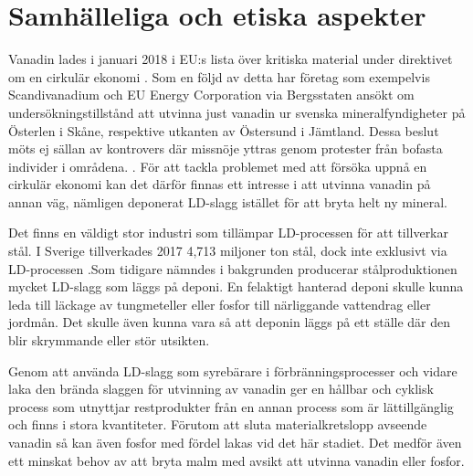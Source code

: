 \section{Samhälleliga och etiska aspekter}

Vanadin lades i januari 2018 i EU:s lista över kritiska material under direktivet om en cirkulär ekonomi \cite{Navigation2018}. 
Som en följd av detta har företag som exempelvis Scandivanadium och EU Energy Corporation via Bergsstaten ansökt om undersökningstillstånd att utvinna just vanadin ur svenska mineralfyndigheter på Österlen i Skåne, respektive utkanten av Östersund i Jämtland. Dessa beslut möts ej sällan av kontrovers där missnöje yttras genom protester från bofasta individer i områdena. \cite{NohrstedtLinda2018}. 
För att tackla problemet med att försöka uppnå en cirkulär ekonomi kan det därför finnas ett intresse i att utvinna vanadin på annan väg, nämligen deponerat LD-slagg istället för att bryta helt ny mineral.

Det finns en  väldigt stor industri som tillämpar LD-processen för att tillverkar stål. I Sverige tillverkades 2017 4,713 miljoner ton stål, dock inte exklusivt via LD-processen \cite{WorldSteelAssociation2015}.Som tidigare nämndes i bakgrunden producerar stålproduktionen mycket LD-slagg som läggs på deponi. En felaktigt hanterad deponi skulle kunna leda till läckage av tungmeteller eller fosfor till närliggande vattendrag eller jordmån. Det skulle även kunna vara så att deponin läggs på ett ställe där den blir skrymmande eller stör utsikten. 

Genom att använda LD-slagg som syrebärare i förbränningsprocesser och vidare laka den brända slaggen för utvinning av vanadin ger en hållbar och cyklisk process som utnyttjar restprodukter från en annan process som är lättillgänglig och finns i stora kvantiteter. Förutom att sluta materialkretslopp avseende vanadin så kan även fosfor med fördel lakas vid det här stadiet. Det medför även ett minskat behov av att bryta malm med avsikt att utvinna vanadin eller fosfor. 